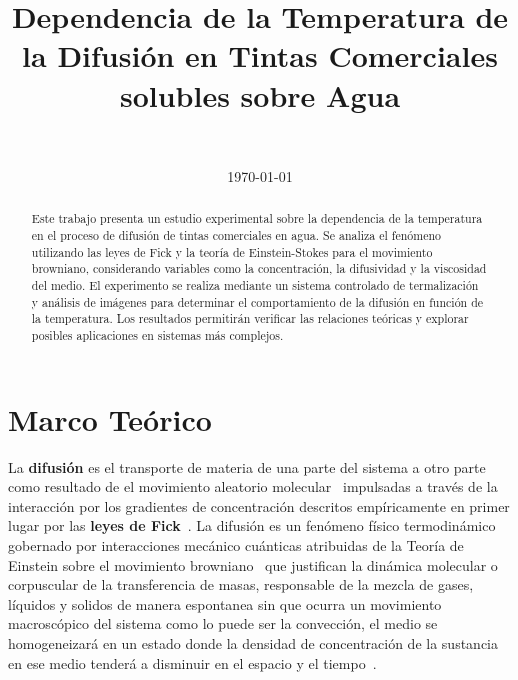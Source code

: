 \documentclass[11pt]{article}
\title{Dependencia de la Temperatura de la Difusión en Tintas Comerciales solubles sobre Agua}
\author{
    \name\\
    {\tt{\email}}}
\date{\today}
\begin{document}
\maketitle
\begin{abstract}
Este trabajo presenta un estudio experimental sobre la dependencia de la temperatura en el proceso de difusión de tintas comerciales en agua. Se analiza el fenómeno utilizando las leyes de Fick y la teoría de Einstein-Stokes para el movimiento browniano, considerando variables como la concentración, la difusividad y la viscosidad del medio. El experimento se realiza mediante un sistema controlado de termalización y análisis de imágenes para determinar el comportamiento de la difusión en función de la temperatura. Los resultados permitirán verificar las relaciones teóricas y explorar posibles aplicaciones en sistemas más complejos.
\end{abstract}
\section*{Marco Teórico}
La \textbf{difusión} es el transporte de materia de una parte del sistema a otro parte como resultado de el movimiento aleatorio molecular~\cite{mehrerHistoryBibliographyDiffusion2007} impulsadas a través de la interacción por los gradientes de concentración descritos empíricamente en primer lugar por las \textbf{leyes de Fick}~\cite{fickLiquidDiffusion1995}. La difusión es un fenómeno físico termodinámico gobernado por interacciones mecánico cuánticas atribuidas de la Teoría de Einstein sobre el movimiento browniano~\cite{einsteinUberMolekularkinetischenTheorie1905} que justifican la dinámica molecular o corpuscular de la transferencia de masas, responsable de la mezcla de gases, líquidos y solidos de manera espontanea sin que ocurra un movimiento macroscópico del sistema como lo puede ser la convección, el medio se homogeneizará en un estado donde la densidad de concentración de la sustancia en ese medio tenderá a disminuir en el espacio y el tiempo~\cite{gilExperimentosFisicaUsando2014}.
\end{document}
